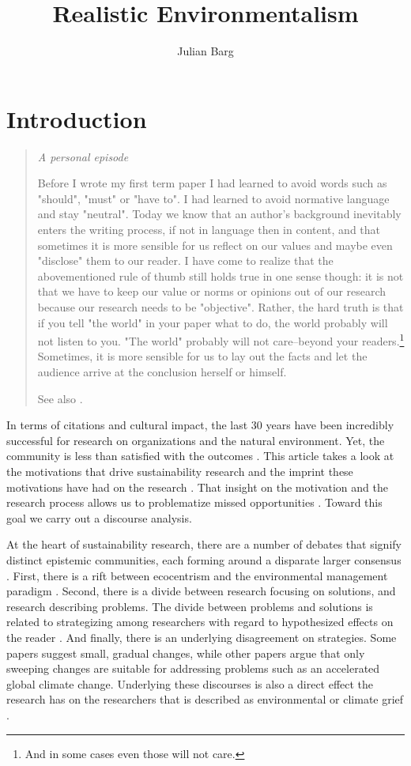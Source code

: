 \documentclass{article}
\title{Realistic Environmentalism}
\author{Julian Barg}
\begin{document}
	\maketitle

	\section*{Introduction}

	\begin{quote}
		\itshape
		A personal episode

		Before I wrote my first term paper I had learned to avoid words such as "should", "must" or "have to". I had learned to avoid normative language and stay "neutral". Today we know that an author's background inevitably enters the writing process, if not in language then in content, and that sometimes it is more sensible for us reflect on our values and maybe even "disclose" them to our reader. I have come to realize that the abovementioned rule of thumb still holds true in one sense though: it is not that we have to keep our value or norms or opinions out of our research because our research needs to be "objective". Rather, the hard truth is that if you tell "the world" in your paper what to do, the world probably will not listen to you. "The world" probably will not care--beyond your readers.\footnote{And in some cases even those will not care.} Sometimes, it is more sensible for us to lay out the facts and let the audience arrive at the conclusion herself or himself.

		See also \citet{Gouldner1962,Zbaracki2021-02-03,Jones2019,Boisot2010}.
	\end{quote}

	In terms of citations and cultural impact, the last 30 years have been incredibly successful for research on organizations and the natural environment. Yet, the community is less than satisfied with the outcomes \cite[e.g.,][]{Ergene2020}. This article takes a look at the motivations that drive sustainability research and the imprint these motivations have had on the research \citep{Latour1987}. That insight on the motivation and the research process allows us to problematize missed opportunities \citep{Alvesson2011}. Toward this goal we carry out a discourse analysis.

	At the heart of sustainability research, there are a number of debates that signify distinct epistemic communities, each forming around a disparate larger consensus \citep[cf.][]{KnorrCetina2000}. First, there is a rift between ecocentrism and the environmental management paradigm \citep{Purser1995}. Second, there is a divide between research focusing on solutions, and research describing problems. The divide between problems and solutions is related to strategizing among researchers with regard to hypothesized effects on the reader \citep{Westoby2019}. And finally, there is an underlying disagreement on strategies. Some papers suggest small, gradual changes, while other papers argue that only sweeping changes are suitable for addressing problems such as an accelerated global climate change. Underlying these discourses is also a direct effect the research has on the researchers that is described as environmental or climate grief \citep{Conroy2019,Cunsolo2018}.
\end{document}
